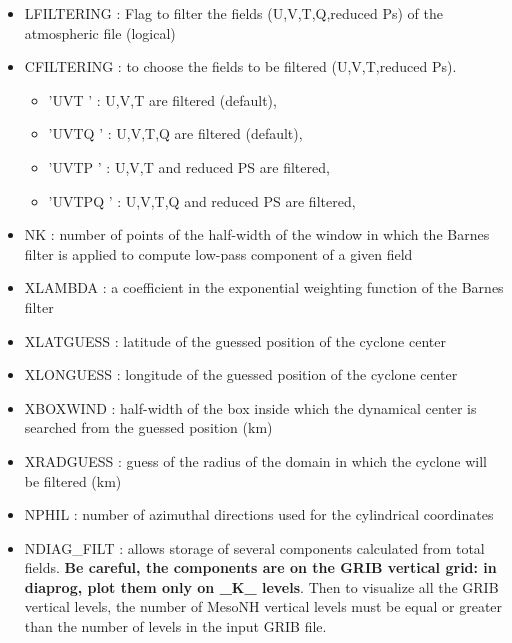 \begin{itemize}
\item LFILTERING : Flag to filter the fields (U,V,T,Q,reduced Ps) of the 
                  atmospheric file (logical)
\item CFILTERING : to choose the fields to be filtered (U,V,T,reduced Ps).
\begin{itemize}
\item 'UVT  ' : U,V,T are filtered (default),
\item 'UVTQ  ' : U,V,T,Q are filtered (default),
\item 'UVTP ' : U,V,T and reduced PS are filtered,
\item 'UVTPQ ' : U,V,T,Q and reduced PS are filtered,
\end{itemize}
\item NK : number of points of the half-width of the window in which the 
Barnes filter is applied to compute low-pass component of a given field
\item XLAMBDA : a coefficient in the exponential weighting function of the 
Barnes filter
\item XLATGUESS : latitude of the guessed position of the cyclone center
\item XLONGUESS : longitude of the guessed position of the cyclone center
\item XBOXWIND : half-width of the box inside which the dynamical center
is searched from the guessed position (km)
\item XRADGUESS : guess  of the radius of the domain in which the cyclone 
will be filtered (km)
\item NPHIL : number of azimuthal directions used for the cylindrical coordinates
\item NDIAG\_FILT : allows storage of several components calculated from total fields. {\bf Be careful, the components are on the GRIB vertical grid: in diaprog,
plot them only on \_K\_ levels}. 
Then to visualize all the GRIB vertical levels, the 
number of MesoNH vertical levels must be equal or greater than the number of
levels in the input GRIB file.
\begin{enumerate}

\end{enumerate}
\end{itemize}
